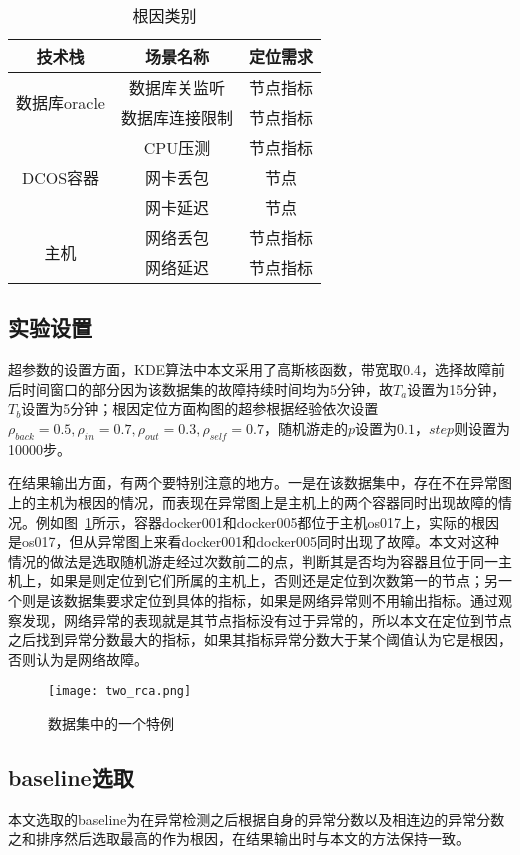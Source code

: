 \begin{table}[htbp]
  \centering
  \begin{tabular}{ccc}
    \toprule
    技术栈 & 场景名称 & 定位需求\\
    \midrule
    \multirow{2}{*}{数据库oracle} & 数据库关监听 & 节点指标\\
     & 数据库连接限制 & 节点指标 \\
    \multirow{3}{*}{DCOS容器} & CPU压测 & 节点指标\\
     & 网卡丢包 & 节点\\
     & 网卡延迟 & 节点\\
    \multirow{2}{*}{主机} & 网络丢包& 节点指标\\
    & 网络延迟 & 节点指标\\
    \bottomrule
  \end{tabular}
  \caption{根因类别}
  \label{tab:error}
\end{table}

\subsection{实验设置}
超参数的设置方面，KDE算法中本文采用了高斯核函数，带宽取0.4，选择故障前后时间窗口的部分因为该数据集的故障持续时间均为5分钟，故$T_a$设置为15分钟，$T_b$设置为5分钟；根因定位方面构图的超参根据经验依次设置$\rho_{back}=0.5, \rho_{in} = 0.7, \rho_{out} = 0.3, \rho_{self} = 0.7$，随机游走的$p$设置为$0.1$，$step$则设置为10000步。

在结果输出方面，有两个要特别注意的地方。一是在该数据集中，存在不在异常图上的主机为根因的情况，而表现在异常图上是主机上的两个容器同时出现故障的情况。例如图~\ref{fig:two:rca}所示，容器docker001和docker005都位于主机os017上，实际的根因是os017，但从异常图上来看docker001和docker005同时出现了故障。本文对这种情况的做法是选取随机游走经过次数前二的点，判断其是否均为容器且位于同一主机上，如果是则定位到它们所属的主机上，否则还是定位到次数第一的节点；另一个则是该数据集要求定位到具体的指标，如果是网络异常则不用输出指标。通过观察发现，网络异常的表现就是其节点指标没有过于异常的，所以本文在定位到节点之后找到异常分数最大的指标，如果其指标异常分数大于某个阈值认为它是根因，否则认为是网络故障。

\begin{figure}[htbp]
  \centering
  \texttt{[image: two\_rca.png]}
  \caption{数据集中的一个特例}
  \label{fig:two:rca}
\end{figure}


\subsection{baseline选取}
本文选取的baseline为在异常检测之后根据自身的异常分数以及相连边的异常分数之和排序然后选取最高的作为根因，在结果输出时与本文的方法保持一致。
